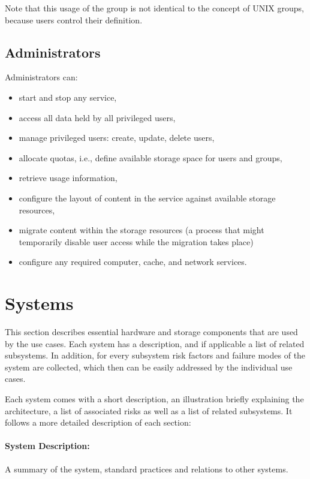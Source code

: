 Note that this usage of the group is not identical to the concept of UNIX groups, because users control their definition.

\subsection*{Administrators}

Administrators can:

\begin{itemize}
	\item  start and stop any service,
	\item  access all data held by all privileged users,
	\item  manage privileged users: create, update, delete users,
	\item  allocate quotas, i.e., define available storage space for users and groups,
	\item  retrieve usage information,
	\item  configure the layout of content in the service against available storage resources,
	\item  migrate content within the storage resources (a process that might temporarily disable user access while the migration takes place)
	\item configure any required computer, cache, and network services.
\end{itemize}


\clearpage
\section{Systems}
\label{sec:use cases/systems}


This section describes essential hardware and storage components that are used by the use cases.
Each system has a description, and if applicable a list of related subsystems.
In addition, for every subsystem risk factors and failure modes of the system are collected, which then can be easily addressed by the individual use cases.

Each system comes with a short description, an illustration briefly explaining the architecture, a list of associated risks as well as a list of related subsystems.
It follows a more detailed description of each section:

\paragraph{System Description:} A summary of the system, standard practices and relations to other systems.
